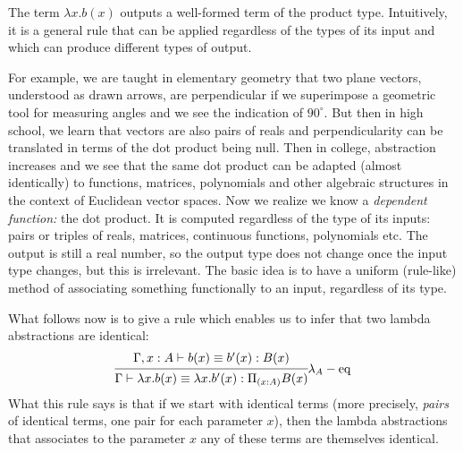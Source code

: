 The term $ \lambda x . b(x) $ outputs a well-formed term of the
product type. Intuitively, it is a general rule that can be applied
 regardless of the types of its input and which
can produce different types of output.

For example, we are taught in elementary geometry that two plane vectors,
understood as drawn arrows, are perpendicular if we superimpose a geometric
tool for measuring angles and we see the indication of $ 90^\circ $.
But then in high school, we learn that vectors are also pairs of reals
and perpendicularity can be translated in terms of the dot product
being null. Then in college, abstraction increases and we see that the
same dot product can be adapted (almost identically) to functions, matrices,
polynomials and other algebraic structures in the context of Euclidean
vector spaces. Now we realize we know a \emph{dependent function:} the
dot product. It is computed  regardless of the
type of its inputs: pairs or triples of reals, matrices, continuous
functions, polynomials etc. The output is still a real number, so the
output type does not change once the input type changes, but this is
irrelevant. The basic idea is to have a uniform (rule-like) method of
associating something functionally to an input, regardless of its type.

What follows now is to give a rule which enables us to infer that two
lambda abstractions are identical:
\[
  \begin{prooftree}
    \hypo{\Gamma, x : A \vdash b(x) \equiv b'(x) : B(x)}
    \infer1{\Gamma \vdash \lambda x . b(x) \equiv %
      \lambda x . b'(x) : \Pi_{(x : A)} B(x)}
  \end{prooftree}\lambda_A-\text{eq}
\]
What this rule says is that if we start with identical terms (more
precisely, \emph{pairs} of identical terms, one pair for each
parameter $ x $), then the lambda abstractions that associates to
the parameter $ x $ any of these terms are themselves identical.


